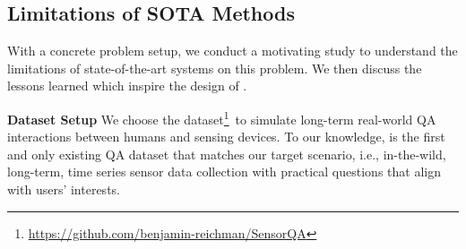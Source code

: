 

\subsection{Limitations of SOTA Methods}
With a concrete problem setup, we conduct a motivating study to understand the limitations of state-of-the-art systems on this problem.
We then discuss the lessons learned which inspire the design of \Method.


\textbf{Dataset Setup}
We choose the \Dataset dataset\footnote{\url{https://github.com/benjamin-reichman/SensorQA}}~\citesensorqa to simulate long-term real-world QA interactions between humans and sensing devices. To our knowledge, \Dataset is the first and only existing QA dataset that matches our target scenario, i.e., in-the-wild, long-term, time series sensor data collection with practical questions that align with users' interests.

